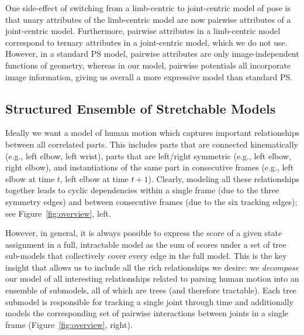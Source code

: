 One side-effect of switching from a limb-centric to joint-centric model of 
pose is that unary attributes of the limb-centric model are now pairwise 
attributes of a joint-centric model.  Furthermore, pairwise attributes in a 
limb-centric model correspond to ternary attributes in a joint-centric model, 
which we do not use.  However, in a standard PS model, pairwise attributes are 
only image-independent functions of geometry, whereas in our model, pairwise 
potentials all incorporate image information, giving us overall a more 
expressive model than standard PS. 



\subsection{Structured Ensemble of Stretchable Models}
Ideally we want a model of human motion which captures important
relationships between all correlated parts.  This includes parts that
are connected kinematically (e.g., left elbow, left wrist), parts that
are left/right symmetric (e.g., left elbow, right elbow), and
instantiations of the same part in consecutive frames (e.g., left
elbow at time $t$, left elbow at time $t+1$).  Clearly, modeling all
these relationships together leads to cyclic dependencies
within a single frame (due to the three symmetry edges) and
between consecutive frames (due to the six tracking edges); see Figure~\ref{fig:overview}, left. 

However, in general, it is always possible to express the score of a
given state assignment in a full, intractable model as the sum of
scores under a set of tree sub-models that collectively cover every
edge in the full model. This is the key insight that allows us to
include all the rich relationships we desire: we {\em decompose} our
model of all interesting relationships related to parsing human motion
into an ensemble of submodels, all of which are trees (and therefore
tractable). Each tree submodel is responsible for tracking a single
joint through time and additionally models the corresponding set of
pairwise interactions between joints in a single frame
(Figure~\ref{fig:overview}, right).


